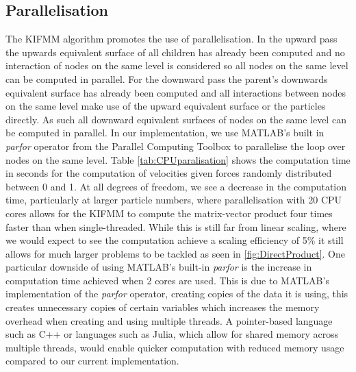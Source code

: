 \subsection{Parallelisation}
The KIFMM algorithm promotes the use of parallelisation. In the upward pass the upwards equivalent surface of all children has already been computed and no interaction of nodes on the same level is considered so all nodes on the same level can be computed in parallel. For the downward pass the parent's downwards equivalent surface has already been computed and all interactions between nodes on the same level make use of the upward equivalent surface or the particles directly. As such all downward equivalent surfaces of nodes on the same level can be computed in parallel. In our implementation, we use MATLAB's built in \textit{parfor} operator from the Parallel Computing Toolbox to parallelise the loop over nodes on the same level. Table \ref{tab:CPUparalisation} shows the computation time in seconds for the computation of velocities given forces randomly distributed between 0 and 1. At all degrees of freedom, we see a decrease in the computation time, particularly at larger particle numbers, where parallelisation with 20 CPU cores allows for the KIFMM to compute the matrix-vector product four times faster than when single-threaded. While this is still far from linear scaling, where we would expect to see the computation achieve a scaling efficiency of 5\% it still allows for much larger problems to be tackled as seen in \cref{fig:DirectProduct}. One particular downside of using MATLAB's built-in \textit{parfor} is the increase in computation time achieved when 2 cores are used. This is due to MATLAB's implementation of the \textit{parfor} operator, creating copies of the data it is using, this creates unnecessary copies of certain variables which increases the memory overhead when creating and using multiple threads. A pointer-based language such as C++ or languages such as Julia, which allow for shared memory across multiple threads, would enable quicker computation with reduced memory usage compared to our current implementation.

